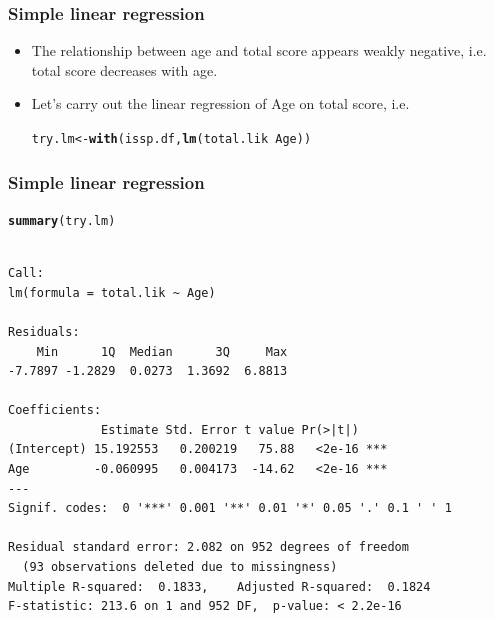 \documentclass{beamer}\usepackage[]{graphicx}\usepackage[]{color}
\makeatletter
\newcommand{\hlopt}[1]{\textcolor[rgb]{0,0,0}{#1}}%
\newcommand{\hlstd}[1]{\textcolor[rgb]{0.345,0.345,0.345}{#1}}%
\newcommand{\hlkwb}[1]{\textcolor[rgb]{0.69,0.353,0.396}{#1}}%
\newcommand{\hlkwd}[1]{\textcolor[rgb]{0.737,0.353,0.396}{\textbf{#1}}}%
\newenvironment{kframe}{%
 \def\at@end@of@kframe{}%
 \ifinner\ifhmode%
  \def\at@end@of@kframe{\end{minipage}}%
  \begin{minipage}{\columnwidth}%
 \fi\fi%
 \def\FrameCommand##1{\hskip\@totalleftmargin \hskip-\fboxsep
 \colorbox{shadecolor}{##1}\hskip-\fboxsep
     \hskip-\linewidth \hskip-\@totalleftmargin \hskip\columnwidth}%
 \MakeFramed {\advance\hsize-\width
   \@totalleftmargin\z@ \linewidth\hsize
   \@setminipage}}%
 {\par\unskip\endMakeFramed%
 \at@end@of@kframe}
\newenvironment{knitrout}{}{} %
\makeatother
\begin{document}
\begin{frame}[fragile]
\frametitle{Simple linear regression}
\begin{itemize}
 \item The relationship between age and total score appears weakly negative, i.e. total score decreases with age.
 \item Let's carry out the linear regression of Age on total score, i.e.
\begin{knitrout}
\color{fgcolor}\begin{kframe}
\begin{alltt}
\hlstd{try.lm} \hlkwb{<-} \hlkwd{with}\hlstd{(issp.df,} \hlkwd{lm}\hlstd{(total.lik}\hlopt{~}\hlstd{Age))}
\end{alltt}
\end{kframe}
\end{knitrout}
\end{itemize}
\end{frame} 

\begin{frame}[fragile]
\frametitle{Simple linear regression}
\begin{scriptsize}
\begin{knitrout}
\color{fgcolor}\begin{kframe}
\begin{alltt}
\hlkwd{summary}\hlstd{(try.lm)}
\end{alltt}
\begin{verbatim}

Call:
lm(formula = total.lik ~ Age)

Residuals:
    Min      1Q  Median      3Q     Max 
-7.7897 -1.2829  0.0273  1.3692  6.8813 

Coefficients:
             Estimate Std. Error t value Pr(>|t|)    
(Intercept) 15.192553   0.200219   75.88   <2e-16 ***
Age         -0.060995   0.004173  -14.62   <2e-16 ***
---
Signif. codes:  0 '***' 0.001 '**' 0.01 '*' 0.05 '.' 0.1 ' ' 1

Residual standard error: 2.082 on 952 degrees of freedom
  (93 observations deleted due to missingness)
Multiple R-squared:  0.1833,	Adjusted R-squared:  0.1824 
F-statistic: 213.6 on 1 and 952 DF,  p-value: < 2.2e-16
\end{verbatim}
\end{kframe}
\end{knitrout}
\end{scriptsize}
\end{frame} 
\end{document}
